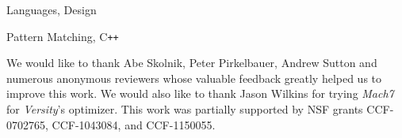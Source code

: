 \documentclass{sigplanconf}
\DeclareRobustCommand{\Cpp}{C\texttt{++}}
\begin{document}

\terms
Languages, Design

\keywords
Pattern Matching, \Cpp{}



%
%





\acks

We would like to thank Abe Skolnik, Peter Pirkelbauer, Andrew Sutton and 
numerous anonymous reviewers whose valuable feedback greatly helped us to 
improve this work. We would also like to thank Jason Wilkins for trying 
\emph{Mach7} for \emph{Versity}'s optimizer. This work was partially supported 
by NSF grants CCF-0702765, CCF-1043084, and CCF-1150055.

\balance

%


%
\end{document}
